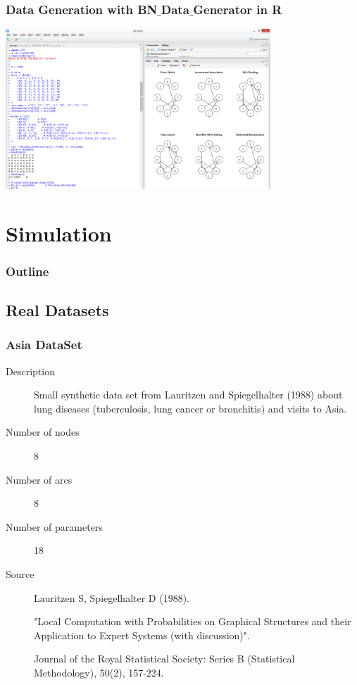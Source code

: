 \documentclass{beamer}
\begin{document}
\begin{frame}
\frametitle{Data Generation with BN$\_$Data$\_$Generator in R}
{\scriptsize{}
	\begin{center}
		\includegraphics[height=170pt]{images/image23}
	\end{center}
}
\end{frame}


\section{Simulation}

\begin{frame}
\frametitle{Outline}
{\scriptsize{}
	\tableofcontents[currentsection]
}
\end{frame}


\subsection{Real Datasets}

\begin{frame}
\frametitle{Asia DataSet}
{\scriptsize{}
\begin{description}
	\item[Description] Small synthetic data set from Lauritzen and Spiegelhalter (1988) about lung diseases (tuberculosis, lung cancer or bronchitis) and visits to Asia.
	
	\item[Number of nodes] 8
	
	\item[Number of arcs] 8
	
	\item[Number of parameters] 18
	
	\item[Source] Lauritzen S, Spiegelhalter D (1988).
	
	"Local Computation with Probabilities on Graphical Structures and their Application to Expert Systems (with discussion)".
	
	Journal of the Royal Statistical Society: Series B (Statistical Methodology), 50(2), 157-224.
\end{description}
}
\end{frame}
\end{document}
